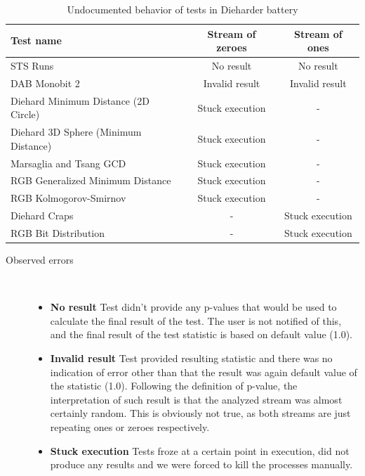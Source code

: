 \documentclass[
  digital,  	%
  color,		%
  oneside,   	%
  12pt,
  nocover,
  notable,
  nolof,
  nolot,
]{fithesis3}
\newenvironment{titlemize}[1]
{
	\begin{description}
	\item[#1]\
	\begin{itemize}
}
{
	\end{itemize}
 	\end{description}
}
\begin{document}
\begin{table}[h!]
\begin{nomar}
\centering
\begin{tabular}{ l || c | c }
\textbf{Test name}                   & \textbf{Stream of zeroes} & \textbf{Stream of ones} \\ \hline \hline
STS Runs                             & No result                & No result                \\ \hline
DAB Monobit 2 						 & Invalid result           & Invalid result           \\ \hline
Diehard Minimum Distance (2D Circle) & Stuck execution          & -                        \\
Diehard 3D Sphere (Minimum Distance) & Stuck execution          & -                        \\
Marsaglia and Tsang GCD              & Stuck execution          & -                        \\
RGB Generalized Minimum Distance     & Stuck execution          & -                        \\
RGB Kolmogorov-Smirnov               & Stuck execution          & -                        \\  
Diehard Craps                        & -                        & Stuck execution          \\
RGB Bit Distribution                 & -                        & Stuck execution          \\
\end{tabular}
\end{nomar}
\caption{Undocumented behavior of tests in Dieharder battery}
\label{tab:dieharder-errors}
\end{table}

\begin{titlemize}{Observed errors}
\item \textbf{No result} Test didn't provide any p-values that would be used to calculate the final result of the test. The user is not notified of this, and the final result of the test statistic is based on default value (1.0).
\item \textbf{Invalid result} Test provided resulting statistic and there was no indication of error other than that the result was again default value of the statistic (1.0). Following the definition of p-value, the interpretation of such result is that the analyzed stream was almost certainly random. This is obviously not true, as both streams are just repeating ones or zeroes respectively. 
\item \textbf{Stuck execution} Tests froze at a certain point in execution, did not produce any results and we were forced to kill the processes manually.
\end{titlemize}
\end{document}
